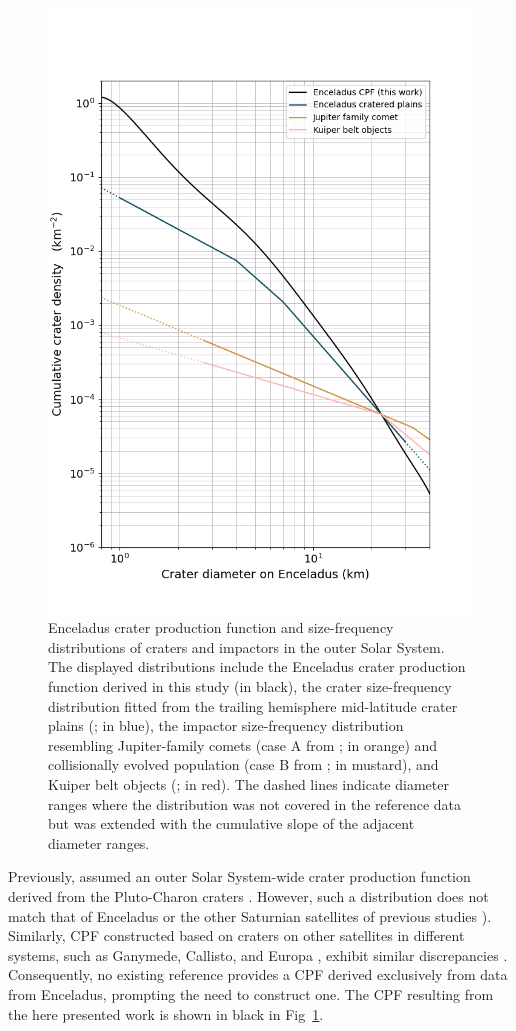 \documentclass[preprint,11pt,3p,times,authoryear]{elsarticle}
\begin{document}
\begin{figure}[H]
    \centering
    \includegraphics[width=0.6\linewidth]{fig/Wongetal2025_fig1.png} %
    \caption{Enceladus crater production function and size-frequency distributions of craters and impactors in the outer Solar System. The displayed distributions include the Enceladus crater production function derived in this study (in black), the crater size-frequency distribution fitted from the trailing hemisphere mid-latitude crater plains (\citet{Kirchoff2009}; in blue), the impactor size-frequency distribution resembling Jupiter-family comets (case A from \citet{Zahnle2003}; in orange) and collisionally evolved population (case B from \citet{Zahnle2003}; in mustard), and Kuiper belt objects (\citet{Singer2019}; in red). The dashed lines indicate diameter ranges where the distribution was not covered in the reference data but was extended with the cumulative slope of the adjacent diameter ranges.}
    \label{fig:cpf_compare}
\end{figure}

Previously, \citet{Wong2023} assumed an outer Solar System-wide crater production function derived from the Pluto-Charon craters \citep[red line in Fig~\ref{fig:cpf_compare}]{Singer2019}.
However, such a distribution does not match that of Enceladus or the other Saturnian satellites of previous studies \citep[blue line]{Kirchoff2022}).
Similarly, CPF constructed based on craters on other satellites in different systems, such as Ganymede, Callisto, and Europa \citep[orange line]{Zahnle2003}, exhibit similar discrepancies \citep{Wong2023}. Consequently, no existing reference provides a CPF derived exclusively from data from Enceladus, prompting the need to construct one. The CPF resulting from the here presented work is shown in black in Fig~\ref{fig:cpf_compare}. \\
\end{document}
